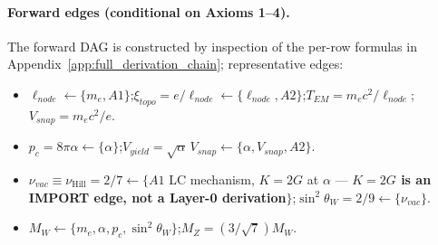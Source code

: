 \paragraph{Forward edges (conditional on Axioms 1--4).}
The forward DAG is constructed by inspection of the per-row formulas in Appendix~\ref{app:full_derivation_chain}; representative edges:
\begin{itemize}
    \item $\ell_{node} \leftarrow \{m_e, A1\}$;\quad $\xi_{topo} = e/\ell_{node} \leftarrow \{\ell_{node}, A2\}$;\quad $T_{EM} = m_e c^2/\ell_{node}$;\quad $V_{snap} = m_e c^2/e$.
    \item $p_c = 8\pi\alpha \leftarrow \{\alpha\}$;\quad $V_{yield} = \sqrt{\alpha}\,V_{snap} \leftarrow \{\alpha, V_{snap}, A2\}$.
    \item $\nu_{vac} \equiv \nu_{\text{Hill}} = 2/7 \leftarrow \{A1$ LC mechanism, $K{=}2G$ at $\alpha$ --- \textbf{$K{=}2G$ is an IMPORT edge, not a Layer-0 derivation}$\}$;\quad $\sin^2\theta_W = 2/9 \leftarrow \{\nu_{vac}\}$.
    \item $M_W \leftarrow \{m_e, \alpha, p_c, \sin^2\theta_W\}$;\quad $M_Z = (3/\sqrt{7})M_W$.

\end{itemize}
